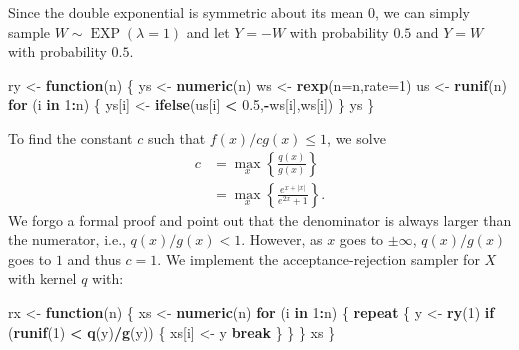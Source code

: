 \documentclass[
  11pt,
]{article}
\newenvironment{Shaded}{\begin{snugshade}}{\end{snugshade}}
\newcommand{\AttributeTok}[1]{\textcolor[rgb]{0.13,0.29,0.53}{#1}}
\newcommand{\ControlFlowTok}[1]{\textcolor[rgb]{0.13,0.29,0.53}{\textbf{#1}}}
\newcommand{\DecValTok}[1]{\textcolor[rgb]{0.00,0.00,0.81}{#1}}
\newcommand{\FloatTok}[1]{\textcolor[rgb]{0.00,0.00,0.81}{#1}}
\newcommand{\FunctionTok}[1]{\textcolor[rgb]{0.13,0.29,0.53}{\textbf{#1}}}
\newcommand{\NormalTok}[1]{#1}
\newcommand{\OtherTok}[1]{\textcolor[rgb]{0.56,0.35,0.01}{#1}}
\newcommand{\SpecialCharTok}[1]{\textcolor[rgb]{0.81,0.36,0.00}{\textbf{#1}}}
\begin{document}
Since the double exponential is symmetric about its mean \(0\), we can
simply sample \(W \sim \operatorname{EXP}(\lambda=1)\) and let
\(Y = -W\) with probability \(0.5\) and \(Y = W\) with probability
\(0.5\).

\begin{Shaded}
\begin{Highlighting}[]
\NormalTok{ry }\OtherTok{\textless{}{-}} \ControlFlowTok{function}\NormalTok{(n)}
\NormalTok{\{}
\NormalTok{  ys }\OtherTok{\textless{}{-}} \FunctionTok{numeric}\NormalTok{(n)}
\NormalTok{  ws }\OtherTok{\textless{}{-}} \FunctionTok{rexp}\NormalTok{(}\AttributeTok{n=}\NormalTok{n,}\AttributeTok{rate=}\DecValTok{1}\NormalTok{)}
\NormalTok{  us }\OtherTok{\textless{}{-}} \FunctionTok{runif}\NormalTok{(n)}
  \ControlFlowTok{for}\NormalTok{ (i }\ControlFlowTok{in} \DecValTok{1}\SpecialCharTok{:}\NormalTok{n) \{ ys[i] }\OtherTok{\textless{}{-}} \FunctionTok{ifelse}\NormalTok{(us[i] }\SpecialCharTok{\textless{}} \FloatTok{0.5}\NormalTok{,}\SpecialCharTok{{-}}\NormalTok{ws[i],ws[i]) \}}
\NormalTok{  ys}
\NormalTok{\}}
\end{Highlighting}
\end{Shaded}

To find the constant \(c\) such that \(f(x)/c g(x) \leq 1\), we solve
\begin{align}
  c &= \max_x \left\{\frac{q(x)}{g(x)}\right\}\\
    &= \max_x \left\{\frac{e^{x+|x|}}{e^{2x}+1}\right\}.
\end{align} We forgo a formal proof and point out that the denominator
is always larger than the numerator, i.e., \(q(x)/g(x) < 1\). However,
as \(x\) goes to \(\pm \infty\), \(q(x)/g(x)\) goes to \(1\) and thus
\(c = 1\). We implement the acceptance-rejection sampler for \(X\) with
kernel \(q\) with:

\begin{Shaded}
\begin{Highlighting}[]
\NormalTok{rx }\OtherTok{\textless{}{-}} \ControlFlowTok{function}\NormalTok{(n)}
\NormalTok{\{}
\NormalTok{  xs }\OtherTok{\textless{}{-}} \FunctionTok{numeric}\NormalTok{(n)}
  \ControlFlowTok{for}\NormalTok{ (i }\ControlFlowTok{in} \DecValTok{1}\SpecialCharTok{:}\NormalTok{n)}
\NormalTok{  \{}
    \ControlFlowTok{repeat}
\NormalTok{    \{}
\NormalTok{      y }\OtherTok{\textless{}{-}} \FunctionTok{ry}\NormalTok{(}\DecValTok{1}\NormalTok{)}
      \ControlFlowTok{if}\NormalTok{ (}\FunctionTok{runif}\NormalTok{(}\DecValTok{1}\NormalTok{) }\SpecialCharTok{\textless{}} \FunctionTok{q}\NormalTok{(y)}\SpecialCharTok{/}\FunctionTok{g}\NormalTok{(y))}
\NormalTok{      \{}
\NormalTok{        xs[i] }\OtherTok{\textless{}{-}}\NormalTok{ y}
        \ControlFlowTok{break}
\NormalTok{      \}}
\NormalTok{    \}}
\NormalTok{  \}}
\NormalTok{  xs}
\NormalTok{\}}
\end{Highlighting}
\end{Shaded}
\end{document}
